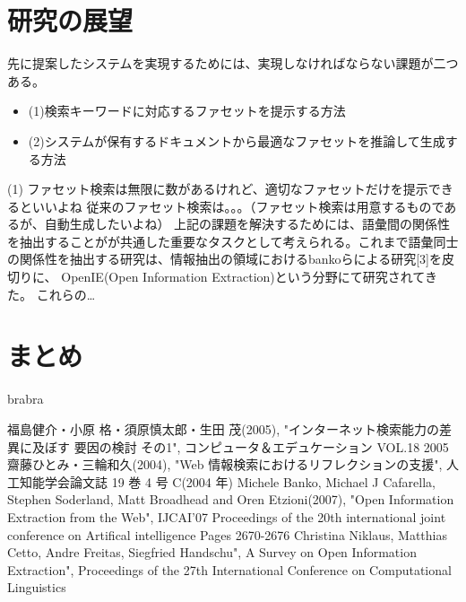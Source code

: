 \documentclass[a4j,12pt, twocolumn]{jarticle}
\begin{document}
\section{研究の展望}
先に提案したシステムを実現するためには、実現しなければならない課題が二つある。
\begin{itemize}
  \item (1)検索キーワードに対応するファセットを提示する方法
  \item (2)システムが保有するドキュメントから最適なファセットを推論して生成する方法
\end{itemize}
(1)
ファセット検索は無限に数があるけれど、適切なファセットだけを提示できるといいよね
従来のファセット検索は。。。（ファセット検索は用意するものであるが、自動生成したいよね）
上記の課題を解決するためには、語彙間の関係性を抽出することがが共通した重要なタスクとして考えられる。これまで語彙同士の関係性を抽出する研究は、情報抽出の領域におけるbankoらによる研究[3]を皮切りに、 OpenIE(Open Information Extraction)という分野にて研究されてきた。
これらの\dots

\section{まとめ}
brabra
\begin{thebibliography}{9}
   福島健介・小原 格・須原慎太郎・生田 茂(2005), "インターネット検索能力の差異に及ぼす 要因の検討 その1", コンピュータ＆エデュケーション VOL.18 2005
   齋藤ひとみ・三輪和久(2004),  "Web 情報検索におけるリフレクションの支援", 人工知能学会論文誌 19 巻 4 号 C(2004 年)
  Michele Banko, Michael J Cafarella, Stephen Soderland, Matt Broadhead and Oren Etzioni(2007), "Open Information Extraction from the Web", IJCAI'07 Proceedings of the 20th international joint conference on Artifical intelligence
Pages 2670-2676 
  Christina Niklaus, Matthias Cetto, Andre Freitas, Siegfried Handschu", A Survey on Open Information Extraction", Proceedings of the 27th International Conference on Computational Linguistics
\end{thebibliography}
\end{document}
